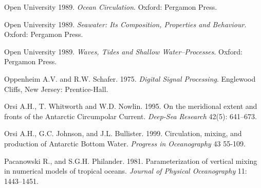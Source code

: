 \begin{thebibliography}{999}
Open University 1989. \textit{Ocean Circulation}.  Oxford: Pergamon
Press.
%

Open University 1989. \textit{Seawater: Its Composition, Properties
  and Behaviour}.  Oxford: Pergamon Press.
%

Open University 1989. \textit{Waves, Tides and Shallow
  Water--Processes}.  Oxford: Pergamon Press.
%

Oppenheim A.V. and R.W. Schafer.  1975. \textit{Digital Signal
  Processing}.  Englewood Cliffs, New Jersey: Prentice-Hall.
%

Orsi A.H., T. Whitworth and W.D. Nowlin.  1995. On the meridional
extent and fronts of the Antarctic Circumpolar
Current. \textit{Deep-Sea Research} 42(5): 641--673.
%

Orsi A.H., G.C. Johnson, and J.L. Bullister.  1999. Circulation,
mixing, and production of Antarctic Bottom Water.  \textit{Progress in
  Oceanography} 43 55-109.
%

Pacanowski R., and S.G.H. Philander.  1981. Parameterization of
vertical mixing in numerical models of tropical
oceans. \textit{Journal of Physical Oceanography} 11: 1443--1451.
%


\end{thebibliography}
